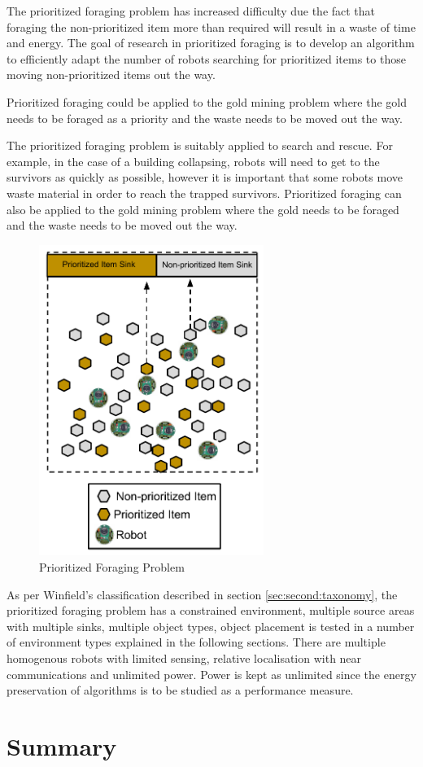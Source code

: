 The prioritized foraging problem has increased difficulty due the fact that  foraging the non-prioritized item more than required will result in a waste of time and energy. The goal of research in prioritized foraging is to develop an algorithm to efficiently adapt the number of robots searching for prioritized items to those moving non-prioritized items out the way. 

Prioritized foraging could be applied to the gold mining problem where the gold needs to be foraged as a priority and the waste needs to be moved out the way.


The prioritized foraging problem is suitably applied to search and rescue. For example, in the case of a building collapsing, robots will need to get to the survivors as quickly as possible, however it is important that some robots move waste material in order to reach the trapped survivors. Prioritized foraging can also be applied to the gold mining problem where the gold needs to be foraged and the waste needs to be moved out the way.


\begin{figure} [h]
	\centering
	\includegraphics[width=0.65\textwidth]{chapters/chapter2/figures/EpuckGoldMining.pdf}
	\caption{Prioritized Foraging Problem }
	\label{prioritizedforaging}
\end{figure}

As per Winfield's classification described in section \ref{sec:second:taxonomy}, the prioritized foraging problem has a constrained environment, multiple source areas with multiple sinks, multiple object types, object placement is tested in a number of environment types explained in the following sections. There are multiple homogenous robots with limited sensing, relative localisation with near communications and unlimited power. Power is kept as unlimited since the energy preservation of algorithms is to be studied as a performance measure. 

\section{Summary}
\label{sec:second:summary}

%
%